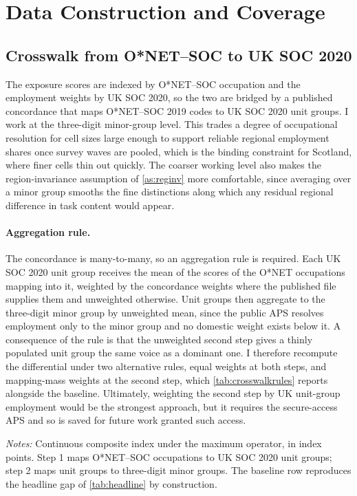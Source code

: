 \section{Data Construction and Coverage}\label{app:data}

\subsection{Crosswalk from O*NET--SOC to UK SOC 2020}

The exposure scores are indexed by O*NET--SOC occupation and the employment weights by UK SOC 2020, so the two are bridged by a published concordance that maps O*NET--SOC 2019 codes to UK SOC 2020 unit groups. I work at the three-digit minor-group level. This trades a degree of occupational resolution for cell sizes large enough to support reliable regional employment shares once survey waves are pooled, which is the binding constraint for Scotland, where finer cells thin out quickly. The coarser working level also makes the region-invariance assumption of \cref{as:reginv} more comfortable, since averaging over a minor group smooths the fine distinctions along which any residual regional difference in task content would appear.

\paragraph{Aggregation rule.} The concordance is many-to-many, so an aggregation rule is required. Each UK SOC 2020 unit group receives the mean of the scores of the O*NET occupations mapping into it, weighted by the concordance weights where the published file supplies them and unweighted otherwise. Unit groups then aggregate to the three-digit minor group by unweighted mean, since the public APS resolves employment only to the minor group and no domestic weight exists below it. A consequence of the rule is that the unweighted second step gives a thinly populated unit group the same voice as a dominant one. I therefore recompute the differential under two alternative rules, equal weights at both steps, and mapping-mass weights at the second step,
which \cref{tab:crosswalkrules} reports alongside the baseline. Ultimately, weighting the second step by UK unit-group employment would be the strongest approach, but it requires the secure-access APS and so is saved for future work granted such access.

\begin{table}[h]
\centering
\caption{Sensitivity of the differential to the crosswalk aggregation rule}
\label{tab:crosswalkrules}
\small

\begin{minipage}{0.92\textwidth}
\vspace{0.4em}\footnotesize
\textit{Notes:} Continuous composite index under the maximum operator, in index points. Step 1 maps O*NET--SOC occupations to UK SOC 2020 unit groups; step 2 maps unit groups to three-digit minor groups. The baseline row reproduces the headline gap of \cref{tab:headline} by construction.
\end{minipage}
\end{table}


